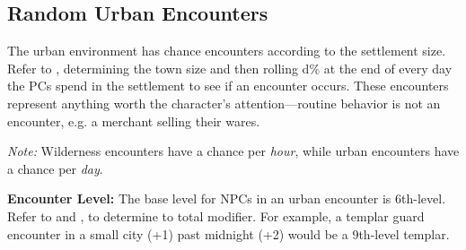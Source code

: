 
\subsection{Random Urban Encounters}
The urban environment has chance encounters according to the settlement size. Refer to , determining the town size and then rolling d\% at the end of every day the PCs spend in the settlement to see if an encounter occurs. These encounters represent anything worth the character's attention---routine behavior is not an encounter, e.g. a merchant selling their wares.

\textit{Note:} Wilderness encounters have a chance per \emph{hour}, while urban encounters have a chance per \emph{day}.

\textbf{Encounter Level:} The base level for NPCs in an urban encounter is 6th-level. Refer to  and , to determine to total modifier. For example, a templar guard encounter in a small city (+1) past midnight (+2) would be a 9th-level templar.

